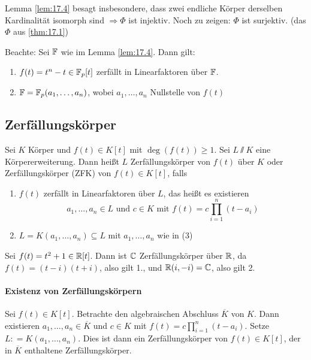 \documentclass[12pt,a4paper]{scrartcl}
\begin{document}
\begin{bem}
	Lemma \ref{lem:17.4} besagt insbesondere, dass zwei endliche Körper derselben Kardinalität isomorph sind $\Rightarrow \Phi$ ist injektiv. Noch zu zeigen: $\Phi$ ist surjektiv. (das $\Phi$ aus \ref{thm:17.1})
\end{bem}

\noindent
Beachte: Sei $\mathbb F$ wie im Lemma \ref{lem:17.4}. Dann gilt:
\begin{enumerate}
	\item $f(t) = t^n-t\in\mathbb F_p[t]$ zerfällt in Linearfaktoren über $\mathbb F$.
	\item $\mathbb F= \mathbb F_p(a_1,\dots, a_n)$, wobei $a_1,\dots, a_n$ Nullstelle von $f(t)$
\end{enumerate}

\subsection{Zerfällungskörper}
\begin{defi}
	Sei $K$ Körper und $f(t)\in K[t]$ mit $\deg(f(t))\geq 1$. Sei $L\sslash K$ eine Körpererweiterung. Dann heißt $L$ Zerfällungskörper von $f(t)$ über $K$ oder Zerfällungskörper (ZFK) von $f(t) \in K[t]$, falls
	\begin{enumerate}
		\item $f(t)$ zerfällt in Linearfaktoren über $L$, das heißt es existieren 
		\begin{equation}
			a_1,\dots, a_n\in L \text{ und } c\in K \text{ mit }f(t) = c\prod_{i = 1}^{n}(t-a_i)
		\end{equation}
		\item $L = K(a_1,\dots, a_n)\subseteq L$ mit $a_1,\dots, a_n$ wie in (3)
	\end{enumerate}
\end{defi}
\begin{bsp}
	Sei $f(t) = t^2+1\in\mathbb R[t]$. Dann ist $\mathbb C$ Zerfällungskörper über $\mathbb R$, da $f(t) = (t-i)(t+i)$, also gilt 1., und $\mathbb R(i,-i) = \mathbb C$, also gilt 2.
\end{bsp}
\paragraph{Existenz von Zerfällungskörpern} Sei $f(t) \in K[t]$. Betrachte den algebraischen Abschluss $\overline{K}$ von $K$. Dann existieren $a_1,\dots, a_n\in\overline{K}$ und $c\in K$ mit $f(t) = c\prod_{i = 1}^{n}(t-a_i)$. Setze $L: = K(a_1,\dots, a_n)$. Dies ist dann ein Zerfällungskörper von $f(t)\in K[t]$, der in $\overline{K}$ enthaltene Zerfällungskörper.
\end{document}
